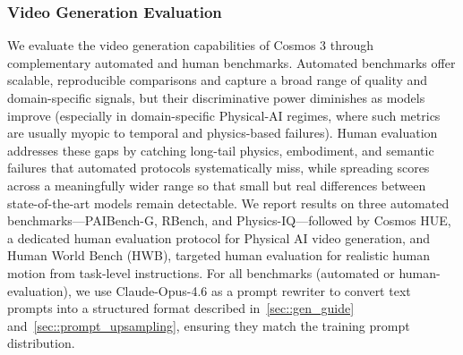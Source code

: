 \subsubsection{Video Generation Evaluation}
\label{subsec::video_eval}

We evaluate the video generation capabilities of Cosmos 3 through complementary automated and human benchmarks. Automated benchmarks offer scalable, reproducible comparisons and capture a broad range of quality and domain-specific signals, but their discriminative power diminishes as models improve (especially in domain-specific Physical-AI regimes, where such metrics are usually myopic to temporal and physics-based failures). Human evaluation addresses these gaps by catching long-tail physics, embodiment, and semantic failures that automated protocols systematically miss, while spreading scores across a meaningfully wider range so that small but real differences between state-of-the-art models remain detectable. We report results on three automated benchmarks---PAIBench-G, RBench, and Physics-IQ---followed by Cosmos HUE, a dedicated human evaluation protocol for Physical AI video generation, and Human World Bench (HWB), targeted human evaluation for realistic human motion from task-level instructions. For all benchmarks (automated or human-evaluation), we use Claude-Opus-4.6 as a prompt rewriter to convert text prompts into a structured format described in~\cref{sec::gen_guide} and~\cref{sec::prompt_upsampling}, ensuring they match the training prompt distribution.

\label{subsubsec::paibench_g}
